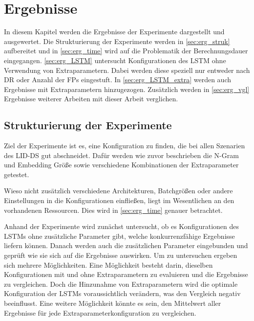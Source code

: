\chapter{Ergebnisse}\label{ch:erg}

In diesem Kapitel werden die Ergebnisse der Experimente dargestellt und ausgewertet.
Die Strukturierung der Experimente werden in \autoref{sec:erg_struk} aufbereitet und in \autoref{sec:erg_time} wird auf die Problematik der Berechnungsdauer eingegangen.
\autoref{sec:erg_LSTM} untersucht Konfigurationen des \ac{LSTM} ohne Verwendung von Extraparametern.
Dabei werden diese speziell nur entweder nach \ac{DR} oder Anzahl der \acp{FP} eingestuft.
In \autoref{sec:erg_LSTM_extra} werden auch Ergebnisse mit Extraparametern hinzugezogen.
Zusätzlich werden in \autoref{sec:erg_vgl} Ergebnisse weiterer Arbeiten mit dieser Arbeit verglichen.

\section{Strukturierung der Experimente}\label{sec:erg_struk}
    Ziel der Experimente ist es, eine Konfiguration zu finden, die bei allen Szenarien des \ac{LID-DS} gut abschneidet.
    Dafür werden wie zuvor beschrieben die N-Gram und Embedding Größe sowie verschiedene Kombinationen der Extraparameter getestet.\par\medskip

    Wieso nicht zusätzlich verschiedene Architekturen, Batchgrößen oder andere Einstellungen in die Konfigurationen einfließen, liegt im Wesentlichen an den vorhandenen Ressourcen.
    Dies wird in \autoref{sec:erg_time} genauer betrachtet.\par\medskip
    Anhand der Experimente wird zunächst untersucht, ob es Konfigurationen des \acp{LSTM} ohne zusätzliche Parameter gibt, welche konkurrenzfähige Ergebnisse liefern können.
    Danach werden auch die zusätzlichen Parameter eingebunden und geprüft wie sie sich auf die Ergebnisse auswirken.
    Um zu untersuchen ergeben sich mehrere Möglichkeiten.
    Eine Möglichkeit besteht darin, dieselben Konfigurationen mit und ohne Extraparametern zu evaluieren und die Ergebnisse zu vergleichen.
    Doch die Hinzunahme von Extraparametern wird die optimale Konfiguration der \acp{LSTM} voraussichtlich verändern, was den Vergleich negativ beeinflusst.
    Eine weitere Möglichkeit könnte es sein, den Mittelwert aller Ergebnisse für jede Extraparameterkonfiguration zu vergleichen.\par\medskip

